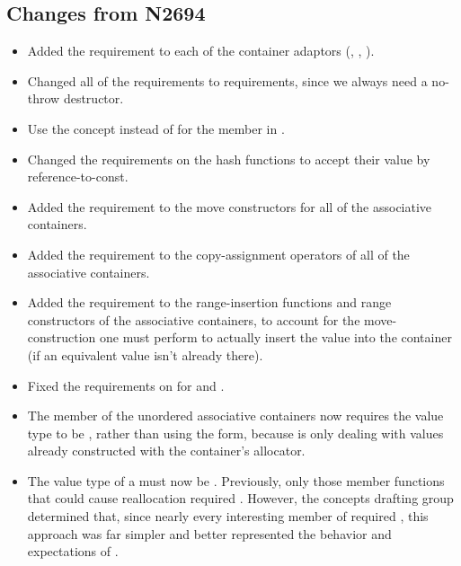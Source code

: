 \documentclass[american,twoside]{book}
\begin{document}
\begin{titlepage}
\section*{Changes from N2694}
\begin{itemize}
\item Added the  requirement to each
  of the container adaptors (, ,
  ).
\item Changed all of the  requirements to
   requirements, since we always need a no-throw
  destructor.
\item Use the  concept instead of
   for the  member in .
\item Changed the  requirements on the hash functions
  to accept their value by reference-to-const.
\item Added the  requirement to the move constructors for all of
  the associative containers.
\item Added the  requirement to the
  copy-assignment operators of all of the associative containers.
\item Added the  requirement to
  the range-insertion functions and range constructors of the
  associative containers, to account for the move-construction one
  must perform to actually insert the value into the container (if an
  equivalent value isn't already there).
\item Fixed the requirements on  for  and
  .
\item The  member of the unordered associative
  containers now requires the value type to be
  , rather than using the
   form, because  is only
  dealing with values already constructed with the container's
  allocator.
\item The value type of a  must now be
  . Previously, only those member functions
  that could cause reallocation required
  . However, the concepts drafting group
  determined that, since nearly every interesting member of
   required , this approach
  was far simpler and better represented the behavior and expectations
  of .
\end{itemize}

\end{titlepage}
\end{document}

